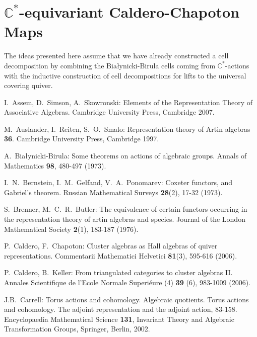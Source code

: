 \documentclass{amsart}
\numberwithin{equation}{section}
\newcommand{\CC}{\mathbb{C}}
\begin{document}

\section{$\CC^*$-equivariant Caldero-Chapoton Maps}
The ideas presented here assume that we have already constructed a cell decomposition by combining the Bia\l{}ynicki-Birula cells coming from $\CC^*$-actions with the inductive construction of cell decompositions for lifts to the universal covering quiver.





\begin{thebibliography}{10}

  I.~Assem, D.~Simson, A.~Skowronski: Elements of the Representation Theory of Associative Algebras. Cambridge University Press, Cambridge 2007.

  M.~Auslander, I.~Reiten, S.~O.~Smalo: Representation theory of Artin algebras {\bf 36}. Cambridge University Press, Cambridge 1997.

  A.~Bia\l{}ynicki-Birula: Some theorems on actions of algebraic groups. Annals of Mathematics \textbf{98}, 480-497 (1973).

  I.~N.~Bernstein, I.~M.~Gelfand, V.~A.~Ponomarev: Coxeter functors, and Gabriel's theorem. Russian Mathematical Surveys \textbf{28}(2), 17-32 (1973).

  S.~Brenner, M.~C.~R.~Butler: The equivalence of certain functors occurring in the representation theory of artin algebras and species. Journal of the London Mathematical Society \textbf{2}(1), 183-187 (1976).

  P.~Caldero, F.~Chapoton: Cluster algebras as {H}all algebras of quiver representations. Commentarii Mathematici Helvetici \textbf{81}(3), 595-616 (2006).

  P.~Caldero, B.~Keller: From triangulated categories to cluster algebras II.  Annales Scientifique de l'Ecole Normale Superi\'{e}ure (4) \textbf{39} (6), 983-1009 (2006).

	J.B.~Carrell: Torus actions and cohomology. Algebraic quotients. Torus actions and cohomology. The adjoint representation and the adjoint action, 83-158. Encyclopaedia Mathematical Science \textbf{131}, Invariant Theory and Algebraic Transformation Groups, Springer, Berlin, 2002.


\end{thebibliography}
\end{document}
